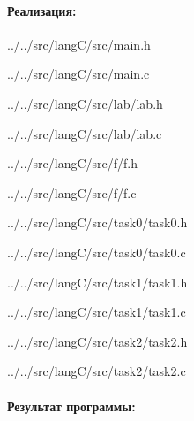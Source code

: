 \newpage



\paragraph{Реализация:} \hspace{0pt}





{../../src/langC/src/main.h}


{../../src/langC/src/main.c}





{../../src/langC/src/lab/lab.h}


{../../src/langC/src/lab/lab.c}



\newpage




{../../src/langC/src/f/f.h}


{../../src/langC/src/f/f.c}




{../../src/langC/src/task0/task0.h}


{../../src/langC/src/task0/task0.c}





{../../src/langC/src/task1/task1.h}


{../../src/langC/src/task1/task1.c}



\newpage




{../../src/langC/src/task2/task2.h}


{../../src/langC/src/task2/task2.c}



\newpage



\paragraph{Результат программы:} \hspace{0pt}



